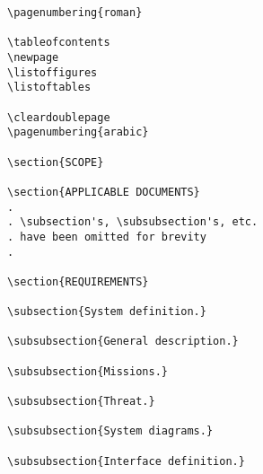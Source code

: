 \begin{itemize}
\begin{small}
\begin{verbatim}
\pagenumbering{roman}

\tableofcontents
\newpage
\listoffigures
\listoftables

\cleardoublepage
\pagenumbering{arabic}

\section{SCOPE}

\section{APPLICABLE DOCUMENTS}
.
. \subsection's, \subsubsection's, etc. 
. have been omitted for brevity
.  

\section{REQUIREMENTS}

\subsection{System definition.}

\subsubsection{General description.}

\subsubsection{Missions.}

\subsubsection{Threat.}

\subsubsection{System diagrams.}

\subsubsection{Interface definition.}


\end{verbatim}
\end{small}
\end{itemize}
